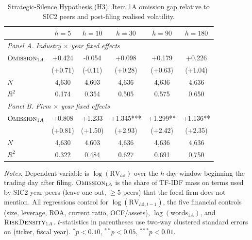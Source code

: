 \begin{table}[htbp]
\centering
\caption{Strategic-Silence Hypothesis (H3): Item 1A omission gap relative to SIC2 peers and post-filing realised volatility.}
\label{tab:silence_main}
\footnotesize
\begin{tabular}{lccccc}
\toprule
& $h=5$ & $h=10$ & $h=30$ & $h=90$ & $h=180$ \\
\midrule
\multicolumn{6}{l}{\textit{Panel A. Industry $\times$ year fixed effects}} \\
$\textsc{Omission}_{1A}$ & +0.424 & -0.054 & +0.098 & +0.179 & +0.226 \\
& (+0.71) & (-0.11) & (+0.28) & (+0.63) & (+1.04) \\
$N$ & 4,630 & 4,603 & 4,636 & 4,636 & 4,636 \\
$R^2$ & 0.174 & 0.354 & 0.505 & 0.575 & 0.650 \\
\midrule
\multicolumn{6}{l}{\textit{Panel B. Firm $\times$ year fixed effects}} \\
$\textsc{Omission}_{1A}$ & +0.808 & +1.233 & +1.345*** & +1.299** & +1.136** \\
& (+0.81) & (+1.50) & (+2.93) & (+2.42) & (+2.35) \\
$N$ & 4,630 & 4,603 & 4,636 & 4,636 & 4,636 \\
$R^2$ & 0.322 & 0.484 & 0.627 & 0.691 & 0.750 \\
\bottomrule
\end{tabular}
\par\smallskip
\begin{flushleft}\footnotesize
\textit{Notes.} Dependent variable is $\log(\textrm{RV}_{h\textrm{d}})$ over the $h$-day window beginning the trading day after filing. $\textsc{Omission}_{1A}$ is the share of TF-IDF mass on terms used by SIC2-year peers (leave-one-out, $\geq 5$ peers) that the focal firm does not mention. All regressions control for $\log(\textrm{RV}_{h\textrm{d}, t-1})$, the five financial controls (size, leverage, ROA, current ratio, OCF/assets), $\log(\textrm{words}_{1A})$, and $\textsc{RiskDensity}_{1A}$. $t$-statistics in parentheses use two-way clustered standard errors on (ticker, fiscal year). $^{*}p<0.10$, $^{**}p<0.05$, $^{***}p<0.01$.
\end{flushleft}
\end{table}
